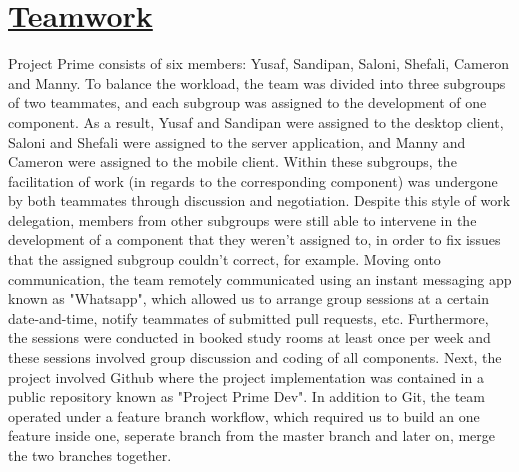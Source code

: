 \documentclass{article}
\begin{document}
\section{\underline{Teamwork}}
Project Prime consists of six members: Yusaf, Sandipan, Saloni, Shefali, Cameron and Manny. To balance the workload, the team was divided into three subgroups of two teammates, and each subgroup was assigned to the development of one component. As a result, Yusaf and Sandipan were assigned to the desktop client, Saloni and Shefali were assigned to the server application, and Manny and Cameron were assigned to the mobile client. Within these subgroups, the facilitation of work (in regards to the corresponding component) was undergone by both teammates through discussion and negotiation. Despite this style of work delegation, members from other subgroups were still able to intervene in the development of a component that they weren't assigned to, in order to fix issues that the assigned subgroup couldn't correct, for example. Moving onto communication, the team remotely communicated using an instant messaging app known as "Whatsapp", which allowed us to arrange group sessions at a certain date-and-time, notify teammates of submitted pull requests, etc. Furthermore, the sessions were conducted in booked study rooms at least once per week and these sessions involved group discussion and coding of all components. Next, the project involved Github where the project implementation was contained in a public repository known as "Project Prime Dev". In addition to Git, the team operated under a feature branch workflow, which required us to build an one feature inside one, seperate branch from the master branch and later on, merge the two branches together.
\end{document}

